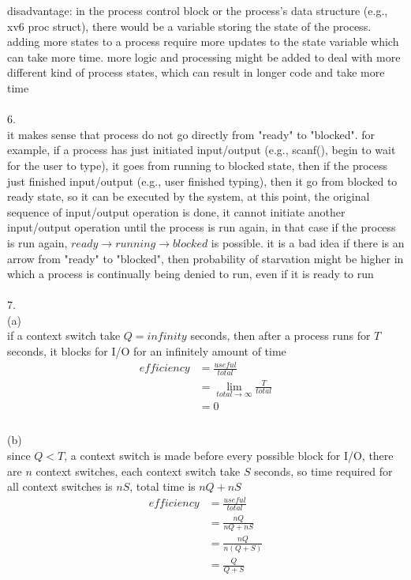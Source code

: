 \documentclass[12pt, border = 4pt, multi]{article} %
\begin{document}
disadvantage: in the process control block or the process's data structure (e.g., xv6 proc struct), there would be a variable storing the state of the process. adding more states to a process require more updates to the state variable which can take more time. more logic and processing might be added to deal with more different kind of process states, which can result in longer code and take more time\\
\\
6.\\
it makes sense that process do not go directly from "ready" to "blocked". for example, if a process has just initiated input/output (e.g., scanf(), begin to wait for the user to type), it goes from running to blocked state, then if the process just finished input/output (e.g., user finished typing), then it go from blocked to ready state, so it can be executed by the system, at this point, the original sequence of input/output operation is done, it cannot initiate another input/output operation until the process is run again, in that case if the process is run again, $ready \rightarrow running \rightarrow blocked$ is possible. it is a bad idea if there is an arrow from "ready" to "blocked", then probability of starvation might be higher in which a process is continually being denied to run, even if it is ready to run\\
\\
7.\\
(a)\\
if a context switch take $Q = infinity$ seconds, then after a process runs for $T$ seconds, it blocks for I/O for an infinitely amount of time
\begin{align*}
efficiency &= \frac{useful}{total}\\
&= \lim_{total \rightarrow \infty} \frac{T}{total}\\
&= 0\\
\end{align*}
\\
(b)\\
since $Q < T$, a context switch is made before every possible block for I/O, there are $n$ context switches, each context switch take $S$ seconds, so time required for all context switches is $nS$, total time is $nQ + nS$
\begin{align*}
efficiency &= \frac{useful}{total}\\
&= \frac{nQ}{nQ + nS}\\
&= \frac{nQ}{n(Q + S)}\\
&= \frac{Q}{Q + S}
\end{align*}
\end{document}
